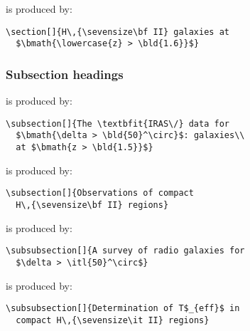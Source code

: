 %
is produced by:
%
\begin{verbatim}
\section[]{H\,{\sevensize\bf II} galaxies at
  $\bmath{\lowercase{z} > \bld{1.6}}$}
\end{verbatim}


\subsubsection*{S\lowercase{ubsection headings}}
        
%
is produced by:
%
\begin{verbatim}
\subsection[]{The \textbfit{IRAS\/} data for
  $\bmath{\delta > \bld{50}^\circ}$: galaxies\\
  at $\bmath{z > \bld{1.5}}$}
\end{verbatim}
\bigskip

%
is produced by:
%
\begin{verbatim}
\subsection[]{Observations of compact 
  H\,{\sevensize\bf II} regions}
\end{verbatim}
\bigskip

%
is produced by:
%
\begin{verbatim}
\subsubsection[]{A survey of radio galaxies for 
  $\delta > \itl{50}^\circ$}
\end{verbatim}
\bigskip
        
%
is produced by:
%
\begin{verbatim}
\subsubsection[]{Determination of T$_{eff}$ in
  compact H\,{\sevensize\it II} regions}
\end{verbatim}
\bigskip

